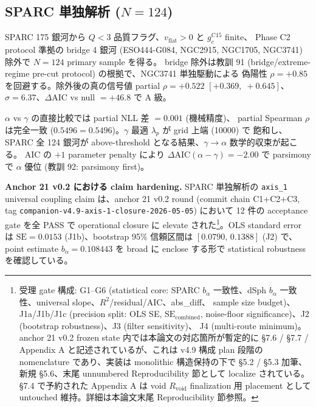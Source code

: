 \documentclass[11pt,a4paper]{ltjsarticle}
\newcommand{\gc}{g_{c}}
\newcommand{\vflat}{v_{\mathrm{flat}}}
\newcommand{\Rvoid}{R_{\mathrm{void}}}
\newcommand{\AIC}{\Delta\mathrm{AIC}}
\begin{document}
\subsection{SPARC 単独解析 ($N=124$)}
SPARC 175 銀河から $Q < 3$ 品質フラグ、$\vflat > 0$ と $\gc^{\mathrm{C15}}$ finite、
Phase C2 protocol 準拠の bridge 4 銀河
(ESO444-G084, NGC2915, NGC1705, NGC3741) 除外で $N=124$ primary sample を得る。
bridge 除外は教訓 91 (bridge/extreme-regime pre-cut protocol) の根拠で、NGC3741 単独駆動による
偽陽性 $\rho = +0.85$ を回避する。除外後の真の信号値 partial $\rho = +0.522$
$[+0.369,\; +0.645]$、$\sigma = 6.37$、$\AIC$ vs null $= +46.8$ で A 級。

$\alpha$ vs $\gamma$ の直接比較では partial NLL 差 $= 0.001$ (機械精度)、
partial Spearman $\rho$ は完全一致 ($0.5496 = 0.5496$)。$\gamma$ 最適 $\lambda_p$ が grid 上端 (10000) で
飽和し、SPARC 全 124 銀河が above-threshold となる結果、$\gamma \to \alpha$ 数学的収束が起こる。
AIC の $+1$ parameter penalty により $\AIC(\alpha - \gamma) = -2.00$ で parsimony で $\alpha$ 優位
(教訓 92: parsimony first)。


\noindent\textbf{Anchor 21 v0.2 における claim hardening.}\quad
SPARC 単独解析の \texttt{axis\_1} universal coupling claim は、anchor 21 v0.2 round
(commit chain C1+C2+C3, tag \texttt{companion-v4.9-axis-1-closure-2026-05-05}) において
12 件の acceptance gate を全 PASS で operational closure に
elevate された\footnote{受理 gate 構成: G1--G6 (statistical core: SPARC $b_\alpha$
一致性、dSph $b_\alpha$ 一致性、universal slope、$R^2$/residual/AIC、abs\_diff、
sample size budget)、J1a/J1b/J1c (precision split: OLS SE, $\mathrm{SE}_{\text{combined}}$,
noise-floor significance)、J2 (bootstrap robustness)、J3 (filter sensitivity)、
J4 (multi-route minimum)。anchor 21 v0.2 frozen state 内では本論文の対応箇所が暫定的に
\S 7.6 / \S 7.7 / Appendix A と記述されているが、これは v4.9 構成 plan 段階の
nomenclature であり、実装は monolithic 構造保持の下で \S 5.2 / \S 5.3 加筆、
新規 \S 5.6、末尾 unnumbered Reproducibility 節として localize されている。
\S 7.4 で予約された Appendix A は void $\Rvoid$ finalization 用 placement として
untouched 維持。詳細は本論文末尾 Reproducibility 節参照。}。OLS standard error は
$\mathrm{SE} = 0.0153$ (J1b)、bootstrap 95\% 信頼区間は $[0.0790,\,0.1388]$ (J2) で、
point estimate $b_\alpha = 0.108443$ を broad に enclose する形で statistical
robustness を確認している。
\end{document}
